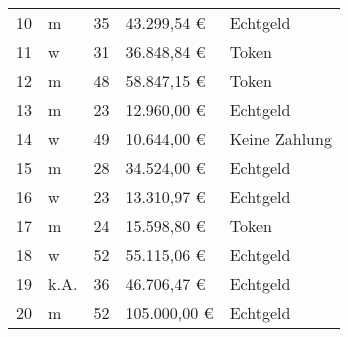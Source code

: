 \begin{table}[H]
\begin{tabular}{lllll}
10                                 & m                                        & 35                                  & 43.299,54 €                             & Echtgeld                              \\
11                                 & w                                        & 31                                  & 36.848,84 €                             & Token                                 \\
12                                 & m                                        & 48                                  & 58.847,15 €                             & Token                                 \\
13                                 & m                                        & 23                                  & 12.960,00 €                             & Echtgeld                              \\
14                                 & w                                        & 49                                  & 10.644,00 €                             & Keine Zahlung                         \\
15                                 & m                                        & 28                                  & 34.524,00 €                             & Echtgeld                              \\
16                                 & w                                        & 23                                  & 13.310,97 €                             & Echtgeld                              \\
17                                 & m                                        & 24                                  & 15.598,80 €                             & Token                                 \\
18                                 & w                                        & 52                                  & 55.115,06 €                             & Echtgeld                              \\
19                                 & k.A.                                     & 36                                  & 46.706,47 €                             & Echtgeld                              \\
20                                 & m                                        & 52                                  & 105.000,00 €                            & Echtgeld                              \\

\end{tabular}
\end{table}
